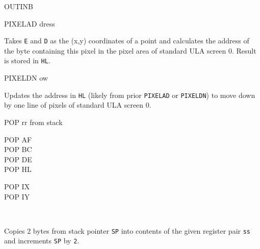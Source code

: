 \begin{basedescript}{
	\desclabelstyle{\multilinelabel}
	\desclabelwidth{3cm}}
\begin{DetailItem}{OUTINB\ZXN}
	\end{DetailItem}

	\begin{DetailItem}{PIXELAD\ZXN}
		{ dress}
		{\SymPIXELAD}

		Takes {\tt E} and {\tt D} as the (x,y) coordinates of a point and calculates the address of the byte containing this pixel in the pixel area of standard ULA screen 0. Result is stored in {\tt HL}.

		\begin{DetailEffects}
			\FlagsPIXELAD
		\end{DetailEffects}
				
		\begin{DetailTiming}
			\DetailTime{2}{8}
		\end{DetailTiming}

	\end{DetailItem}
	
	\pagebreak
	\begin{DetailItem}{PIXELDN\ZXN}
		{ ow\IH{N}}
		{\SymPIXELDN}

		Updates the address in {\tt HL} (likely from prior {\tt PIXELAD} or {\tt PIXELDN}) to move down by one line of pixels of standard ULA screen 0.

		\begin{DetailEffects}
			\FlagsPIXELDN
		\end{DetailEffects}
				
		\begin{DetailTiming}
		\end{DetailTiming}

	\end{DetailItem}

	\begin{DetailItem}{POP rr}
		{ from stack}
		{\SymPOP{rr}}

		\begin{DetailVariants}
			POP AF\\
			POP BC\\
			POP DE\\
			POP HL

			\columnbreak
			POP IX\\
			POP IY

			\columnbreak
			~
		\end{DetailVariants}

		Copies 2 bytes from stack pointer {\tt SP} into contents of the given register pair {\tt ss} and increments {\tt SP} by {\tt 2}.


\end{DetailItem}
\end{basedescript}
